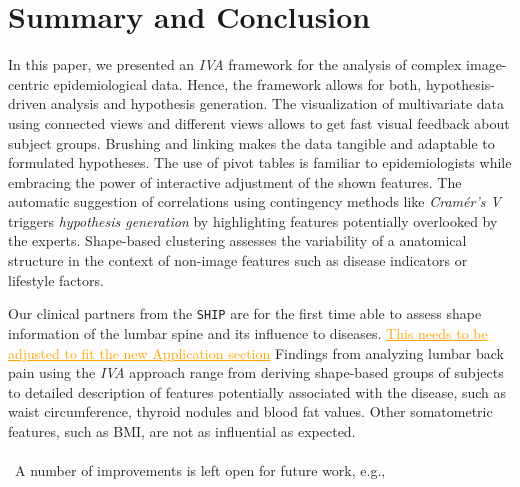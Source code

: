 \documentclass[journal]{style/vgtc} 			          %
\newcommand{\com}[1]{\textcolor{orange}{\uline{#1}}}
\begin{document}
% 

\section{Summary and Conclusion}
In this paper, we presented an \emph{IVA} framework for the analysis of complex image-centric epidemiological data.
%
Hence, the framework allows for both, hypothesis-driven analysis and hypothesis generation.
%
The visualization of multivariate data using connected views and different views allows to get fast visual feedback about subject groups.
%
Brushing and linking makes the data tangible and adaptable to formulated hypotheses.
%
The use of pivot tables is familiar to epidemiologists while embracing the power of interactive adjustment of the shown features.
%
The automatic suggestion of correlations using contingency methods like \emph{Cram\'{e}r's V} triggers \emph{hypothesis generation} by highlighting features potentially overlooked by the experts.
%
Shape-based clustering assesses the variability of a anatomical structure in the context of non-image features such as disease indicators or lifestyle factors.

Our clinical partners from the \texttt{SHIP} are for the first time able to assess shape information of the lumbar spine and its influence to diseases.
%
\com{This needs to be adjusted to fit the new Application section}
Findings from analyzing lumbar back pain using the \emph{IVA} approach range from deriving shape-based groups of subjects to detailed description of features potentially associated with the disease, such as waist circumference, thyroid nodules and blood fat values.
%
Other somatometric features, such as BMI, are not as influential as expected.
%
\\\\\
A number of improvements is left open for future work, e.g.,
\end{document}
